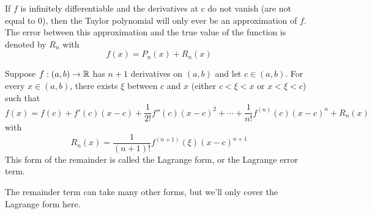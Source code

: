 If $f$ is infinitely differentiable and the derivatives at $c$ do not vanish (are not equal to 0), then the Taylor polynomial will only ever be an approximation of $f$. The error between this approximation and the true value of the function is denoted by $R_n$ with
\[
  f(x) = P_n(x) + R_n(x)
\]

\begin{theorem}
  \label{thm:taylor}
  Suppose $f: (a, b) \to \mathbb{R}$ has $n + 1$ derivatives on $(a, b)$ and let $c \in (a, b)$. For every $x \in (a, b)$, there exists $\xi$ between $c$ and $x$ (either $c < \xi < x$ or $x < \xi < c$) such that
  \[
    f(x) = f(c) + f'(c)(x - c) + \frac{1}{2!} f''(c) (x - c) ^ 2 + \cdots + \frac{1}{n!} f ^ {(n)} (c) (x - c) ^ n + R_n(x)
  \]
  with
  \[
    R_n(x) = \frac{1}{(n + 1)!} f ^ {(n + 1)} (\xi) (x - c) ^ {n + 1}
  \]
  This form of the remainder is called the Lagrange form, or the Lagrange error term.
\end{theorem}
The remainder term can take many other forms, but we'll only cover the Lagrange form here.
